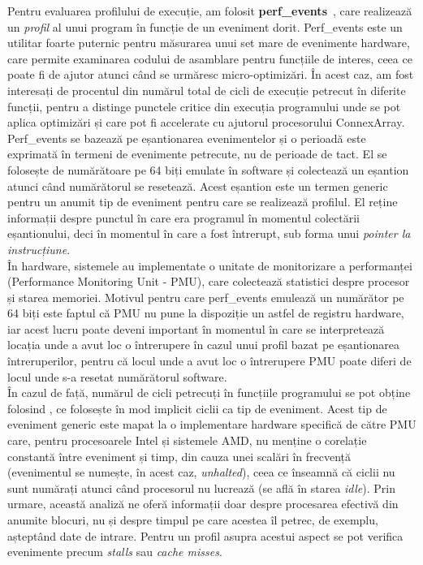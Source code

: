 Pentru evaluarea profilului de execuție, am folosit
\textbf{perf\_events}~\cite{perf}, care realizează un \textit{profil} al unui
program în funcție de un eveniment dorit.  Perf\_events este un
utilitar foarte puternic pentru măsurarea unui set mare de evenimente hardware,
care permite examinarea codului de asamblare pentru funcțiile de interes, ceea
ce poate fi de ajutor atunci când se urmăresc micro-optimizări.  În acest caz,
am fost interesați de procentul din numărul total de cicli de execuție petrecut
în diferite funcții, pentru a distinge punctele critice din execuția programului
unde se pot aplica optimizări și care pot fi accelerate cu ajutorul procesorului
ConnexArray. \\

Perf\_events se bazează pe eșantionarea evenimentelor și o perioadă
este exprimată în termeni de evenimente petrecute, nu de perioade de tact. El se
folosește de numărătoare pe 64 biți emulate în software și colectează un
eșantion atunci când numărătorul se resetează. Acest eșantion este un termen
generic pentru un anumit tip de eveniment pentru care se realizează profilul. El
reține informații despre punctul în care era programul în momentul colectării
eșantionului, deci în momentul în care a fost întrerupt, sub forma unui
\textit{pointer la instrucțiune}. \\

În hardware, sistemele au implementate o unitate de monitorizare a performanței
(Performance Monitoring Unit - PMU), care colectează statistici despre
procesor și starea memoriei. Motivul pentru care perf\_events emulează un
numărător pe 64 biți este faptul că PMU nu pune la dispoziție un astfel de
registru hardware, iar acest lucru poate deveni important în momentul
în care se interpretează locația unde a avut loc o întrerupere în cazul unui
profil bazat pe eșantionarea întreruperilor, pentru că locul unde a avut loc o
întrerupere PMU poate diferi de locul unde s-a resetat numărătorul software. \\

În cazul de față, numărul de cicli petrecuți în funcțiile
programului se pot obține folosind , ce folosește în mod
implicit ciclii ca tip de eveniment. Acest tip de eveniment generic este mapat
la o implementare hardware specifică de către PMU care, pentru procesoarele
Intel și sistemele AMD, nu menține o corelație constantă între eveniment și
timp, din cauza unei scalări în frecvență (evenimentul se numește, în acest caz,
\textit{unhalted}), ceea ce înseamnă că ciclii nu sunt numărați atunci când
procesorul nu lucrează (se află în starea \textit{idle}). Prin urmare, această
analiză ne oferă informații doar despre procesarea efectivă din anumite blocuri,
nu și despre timpul pe care acestea îl petrec, de exemplu, așteptând date de
intrare. Pentru un profil asupra acestui aspect se pot verifica evenimente
precum \textit{stalls} sau \textit{cache misses}. \\


